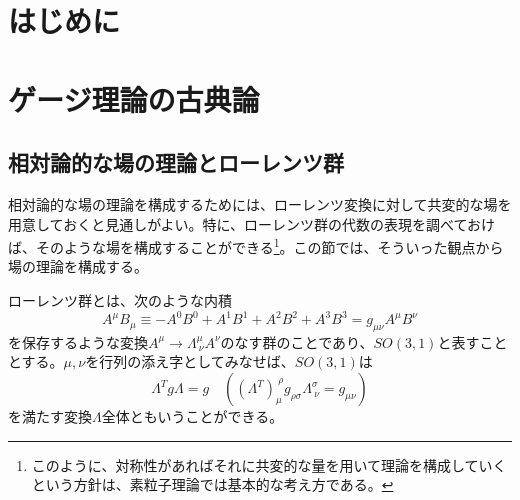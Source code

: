 \documentclass[unicode,a4paper,10pt]{ltjsarticle}
\begin{document}
\maketitle
\tableofcontents

\clearpage
\section{はじめに}




\clearpage
\section{ゲージ理論の古典論}

\subsection{相対論的な場の理論とローレンツ群}

相対論的な場の理論を構成するためには、ローレンツ変換に対して共変的な場を用意しておくと見通しがよい。特に、ローレンツ群の代数の表現を調べておけば、そのような場を構成することができる\footnote{
  このように、対称性があればそれに共変的な量を用いて理論を構成していくという方針は、素粒子理論では基本的な考え方である。
}。この節では、そういった観点から場の理論を構成する。

ローレンツ群とは、次のような内積
\begin{equation}
  A^{\mu}B_{\mu}
  \equiv
  -
  A^{0}B^{0}
  +
  A^{1}B^{1}
  +
  A^{2}B^{2}
  +
  A^{3}B^{3}
  =
  g_{\mu\nu}A^{\mu}B^{\nu}
\end{equation}
を保存するような変換$A^{\mu}\rightarrow\Lambda^{\mu}_{\ \nu}A^{\nu}$のなす群のことであり、$SO(3,1)$と表すこととする。$\mu,\nu$を行列の添え字としてみなせば、$SO(3,1)$は
\begin{equation}
  \Lambda^{T}g\Lambda
  =
  g
  \quad
  ((\Lambda^{T})^{\ \rho}_{\mu}g_{\rho\sigma}\Lambda^{\sigma}_{\ \nu}=g_{\mu\nu})
\end{equation}
を満たす変換$\Lambda$全体ともいうことができる。


















\end{document}
